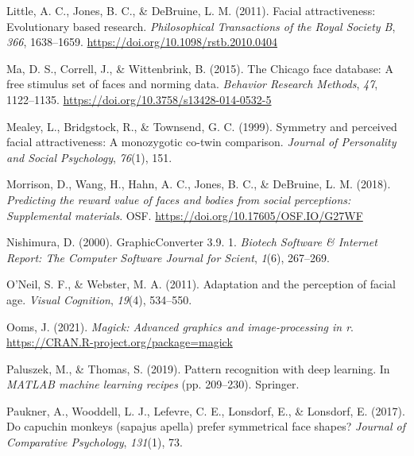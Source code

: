\documentclass[
  doc,floatsintext]{apa6}
\newlength{\cslhangindent}
\newlength{\cslentryspacingunit} %
\newenvironment{CSLReferences}[2] %
 {%
  \setlength{\parindent}{0pt}
  \ifodd #1
  \let\oldpar\par
  \def\par{\hangindent=\cslhangindent\oldpar}
  \fi
  \setlength{\parskip}{#2\cslentryspacingunit}
 }%
 {}
\begin{document}
\begin{CSLReferences}{1}{0}
\leavevmode{}%
Little, A. C., Jones, B. C., \& DeBruine, L. M. (2011). Facial attractiveness: Evolutionary based research. \emph{Philosophical Transactions of the Royal Society B}, \emph{366}, 1638--1659. \url{https://doi.org/10.1098/rstb.2010.0404}

\leavevmode{}%
Ma, D. S., Correll, J., \& Wittenbrink, B. (2015). The {Chicago} face database: A free stimulus set of faces and norming data. \emph{Behavior Research Methods}, \emph{47}, 1122--1135. \url{https://doi.org/10.3758/s13428-014-0532-5}

\leavevmode{}%
Mealey, L., Bridgstock, R., \& Townsend, G. C. (1999). Symmetry and perceived facial attractiveness: A monozygotic co-twin comparison. \emph{Journal of Personality and Social Psychology}, \emph{76}(1), 151.

\leavevmode{}%
Morrison, D., Wang, H., Hahn, A. C., Jones, B. C., \& DeBruine, L. M. (2018). \emph{Predicting the reward value of faces and bodies from social perceptions: Supplemental materials}. OSF. \url{https://doi.org/10.17605/OSF.IO/G27WF}

\leavevmode{}%
Nishimura, D. (2000). GraphicConverter 3.9. 1. \emph{Biotech Software \& Internet Report: The Computer Software Journal for Scient}, \emph{1}(6), 267--269.

\leavevmode{}%
O'Neil, S. F., \& Webster, M. A. (2011). Adaptation and the perception of facial age. \emph{Visual Cognition}, \emph{19}(4), 534--550.

\leavevmode{}%
Ooms, J. (2021). \emph{Magick: Advanced graphics and image-processing in r}. \url{https://CRAN.R-project.org/package=magick}

\leavevmode{}%
Paluszek, M., \& Thomas, S. (2019). Pattern recognition with deep learning. In \emph{MATLAB machine learning recipes} (pp. 209--230). Springer.

\leavevmode{}%
Paukner, A., Wooddell, L. J., Lefevre, C. E., Lonsdorf, E., \& Lonsdorf, E. (2017). Do capuchin monkeys (sapajus apella) prefer symmetrical face shapes? \emph{Journal of Comparative Psychology}, \emph{131}(1), 73.


\end{CSLReferences}
\end{document}
